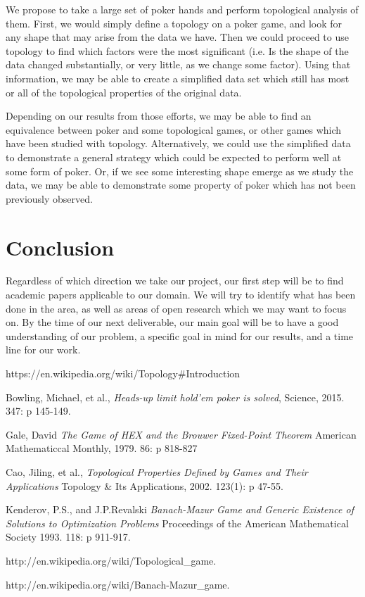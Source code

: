 \documentclass[11pt]{article}
\begin{document}
We propose to take a large set of poker hands and perform topological analysis of
them. First, we would simply define a topology on a poker game, and look for any
shape that may arise from the data we have. Then we could proceed to use topology
to find which factors were the most significant (i.e. Is the shape of the data
changed substantially, or very little, as we change some factor). Using that
information, we may be able to create a simplified data set which still has
most or all of the topological properties of the original data.

Depending on our results from those efforts, we may be able to find an equivalence
between poker and some topological games, or other games which have been
studied with topology. Alternatively, we could use the
simplified data to demonstrate a general strategy which could be expected to
perform well at some form of poker. Or, if we see some interesting shape
emerge as we study the data, we may be able to demonstrate some property of
poker which has not been previously observed.

\section*{Conclusion}
Regardless of which direction we take our project, our first step will be to find
academic papers applicable to our domain. We will try to identify what has been done
in the area, as well as areas of open research which we may want to focus on. By the
time of our next deliverable, our main goal will be to have a good understanding of
our problem, a specific goal in mind for our results, and a time line for
our work.

\newpage
\begin{thebibliography}{9}

  https://en.wikipedia.org/wiki/Topology\#Introduction

  Bowling, Michael, et al.,
  \emph{Heads-up limit hold'em poker is solved},
  Science,
  2015. 347: p 145-149.
  
  Gale, David
  \emph{The Game of HEX and the Brouwer Fixed-Point Theorem}
  American Mathematiccal Monthly,
  1979. 86: p 818-827
	
  Cao, Jiling, et al.,
  \emph{Topological Properties Defined by Games and Their Applications}
  Topology \& Its Applications,
  2002. 123(1): p 47-55.
  
  Kenderov, P.S., and J.P.Revalski
  \emph{Banach-Mazur Game and Generic Existence of Solutions to Optimization Problems}
  Proceedings of the American Mathematical Society
  1993. 118: p 911-917.
  
  http://en.wikipedia.org/wiki/Topological\_game.

  http://en.wikipedia.org/wiki/Banach-Mazur\_game.

	
\end{thebibliography}
\end{document}
